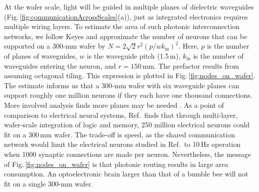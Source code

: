\documentclass{article}
\newcommand{\onlinecite}[1]{\hspace{-1 ex} \nocite{#1}\citenum{#1}}
\newenvironment{Figure}
  {\par\medskip\noindent\minipage{\linewidth}}
  {\endminipage\par\medskip}
\begin{document}
\begin{multicols}{2}
\begin{Figure}
\end{Figure}
At the wafer scale, light will be guided in multiple planes of dielectric waveguides \cite{chbu2017,chbu2018} (Fig.\,\ref{fig:communicationAcrossScales}(a)), just as integrated electronics requires multiple wiring layers. To estimate the area of such photonic interconnection networks, we follow Keyes \cite{ke1982} and approximate the number of neurons that can be supported on a 300-mm wafer by $N = 2\sqrt{2}r^2\left(p/wk_{\mathrm{in}}\right)^2$. Here, $p$ is the number of planes of waveguides, $w$ is the waveguide pitch (1.5\,\textmu m), $k_{\mathrm{in}}$ is the number of waveguides entering the neuron, and $r = 150$\,mm. The prefactor results from assuming octagonal tiling. This expression is plotted in Fig.\,\ref{fig:nodes_on_wafer}. The estimate informs us that a 300-mm wafer with six waveguide planes can support roughly one million neurons if they each have one thousand connections. More involved analysis finds more planes may be needed \cite{sh2019}. As a point of comparison to electrical neural systems, Ref.\,\onlinecite{kuwa2017} finds that through multi-layer, wafer-scale integration of logic and memory, 250 million electrical neurons could fit on a 300\,mm wafer. The trade-off is speed, as the shared communication network would limit the electrical neurons studied in Ref.\,\onlinecite{kuwa2017} to 10\,Hz operation when 1000 synaptic connections are made per neuron. Nevertheless, the message of Fig.\,\ref{fig:nodes_on_wafer} is that photonic routing results in large area consumption. An optoelectronic brain larger than that of a bumble bee will not fit on a single 300-mm wafer.


\end{multicols}
\end{document}
